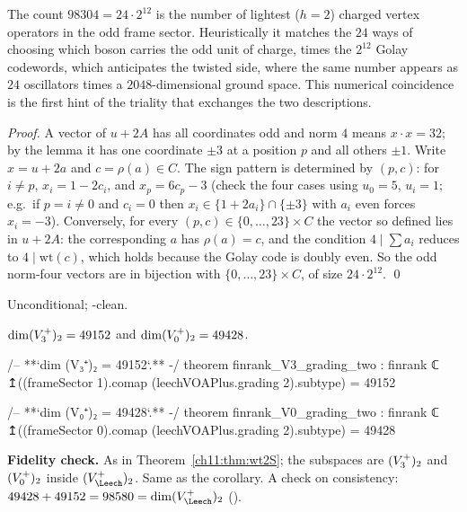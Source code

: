 \begin{physics}
The count $98304=24\cdot2^{12}$ is the number of lightest ($h=2$) charged vertex operators in the odd frame sector. Heuristically it matches the $24$ ways of choosing which boson carries the odd unit of charge, times the $2^{12}$ Golay codewords, which anticipates the twisted side, where the same number appears as $24$ oscillators times a $2048$-dimensional ground space. This numerical coincidence is the first hint of the triality that exchanges the two descriptions.
\end{physics}
\emph{Proof.}  A vector of $u+2A$ has all coordinates odd and norm $4$ means $x\cdot x=32$; by the
lemma it has one coordinate $\pm3$ at a position $p$ and all others $\pm1$.  Write $x=u+2a$ and
$c=\rho(a)\in C$.  The sign pattern is determined by $(p,c)$: for $i\ne p$, $x_i=1-2c_i$, and
$x_p=6c_p-3$ (check the four cases using $u_0=5$, $u_i=1$; e.g.\ if $p=i\neq0$ and $c_i=0$ then
$x_i\in\{1+2a_i\}\cap\{\pm3\}$ with $a_i$ even forces $x_i=-3$).  Conversely, for every
$(p,c)\in\{0,\dots,23\}\times C$ the vector so defined lies in $u+2A$: the corresponding $a$ has
$\rho(a)=c$, and the condition $4\mid\sum a_i$ reduces to $4\mid\mathrm{wt}(c)$, which holds
because the Golay code is doubly even.  So the odd norm-four vectors are in bijection with
$\{0,\ldots,23\}\times C$, of size $24\cdot 2^{12}$. \qed
\begin{status}Unconditional; -clean.\end{status}

\begin{corollary}\label{ch11:cor:wt2}
$\dim(V_3^{+})_2=49152$ and $\dim(V_0^{+})_2=49428$.
\end{corollary}
\begin{leancode}
/-- **`dim (V₃⁺)₂ = 49152`.** -/
theorem finrank_V3_grading_two :
    finrank ℂ ↥((frameSector 1).comap (leechVOAPlus.grading 2).subtype) = 49152

/-- **`dim (V₀⁺)₂ = 49428`.** -/
theorem finrank_V0_grading_two :
    finrank ℂ ↥((frameSector 0).comap (leechVOAPlus.grading 2).subtype) = 49428
\end{leancode}
\begin{dictionary}
\textbf{Fidelity check.}  As in Theorem~\ref{ch11:thm:wt2S}; the subspaces are $(V_3^{+})_2$ and
$(V_0^{+})_2$ inside $(V_\Leech^+)_2$.  Same as the corollary.  A check on consistency:
$49428+49152=98580=\dim(V_\Leech^+)_2$ ().
\end{dictionary}

